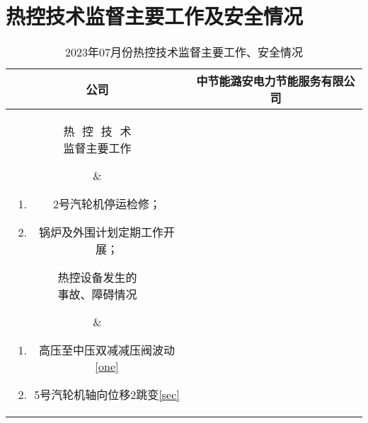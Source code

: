 \chapter{热控技术监督主要工作及安全情况}
\begin{table}[htbp]
	\centering
	\caption{2023年07月份热控技术监督主要工作、安全情况}
\begin{tabular}{|c|c|}
\hline
	公司 & 中节能潞安电力节能服务有限公司\tabularnewline
\hline
	\parbox[c][50ex][c]{6em}{热\,\,\,\,控\,\,\,\,技\,\,\,\,术\\监督主要工作}&
\begin{minipage}[c][50ex][c]{35em}
			\begin{enumerate}
				\item 2号汽轮机停运检修；
				\item 锅炉及外围计划定期工作开展；
			\end{enumerate}
		\end{minipage}
	\tabularnewline  
\hline
	\parbox[c][50ex][c]{7em}{热控设备发生的\\事故、障碍情况}&
		\begin{minipage}[c][50ex][c]{35em}
			\begin{enumerate}
				\item 高压至中压双减减压阀波动\ref{one}
				\item 5号汽轮机轴向位移2跳变\ref{sec}
			\end{enumerate}
		\end{minipage}
	\tabularnewline  
\hline
	\tabularnewline
\hline
\end{tabular}
\end{table}
\clearpage
